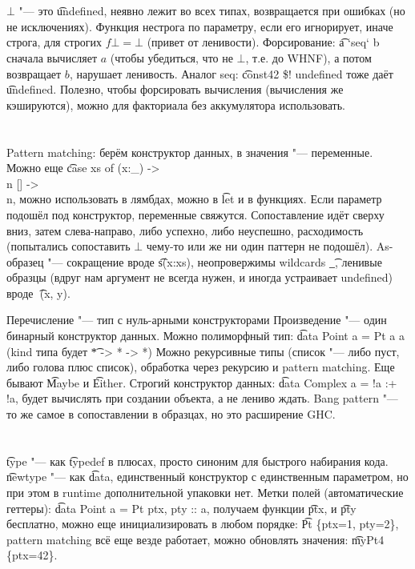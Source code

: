 \section{} %
$\bot$ "--- это \t{undefined}, неявно лежит во всех типах,
возвращается при ошибках (но не исключениях).
Функция нестрога по параметру, если его игнорирует, иначе строга,
для строгих $f \bot = \bot$ (привет от ленивости).
Форсирование: \t{a `seq` b} сначала вычисляет $a$ (чтобы убедиться, что не $\bot$,
т.е. до WHNF), а потом возвращает $b$, нарушает ленивость.
Аналог seq: \t{const42 \$! undefined} тоже даёт \t{undefined}.
Полезно, чтобы форсировать вычисления (вычисления же кэшируются),
можно для факториала без аккумулятора использовать.

\section{} %
Pattern matching: берём конструктор данных, в значения "--- переменные.
Можно еще \t{case xs of (x:\_) -> \\n [] -> \\n}, можно использовать в лямбдах,
можно в \t{let} и в функциях.
Если параметр подошёл под конструктор, переменные свяжутся.
Сопоставление идёт сверху вниз, затем слева-направо, либо успехно, либо неуспешно,
расходимость (попытались сопоставить $\bot$ чему-то или же ни один паттерн не подошёл).
As-образец "--- сокращение вроде \t{s\@(x:xs)}, неопровержимы wildcards \t{\_},
ленивые образцы (вдруг нам аргумент не всегда нужен, и иногда устраивает undefined) вроде \t{~(x, y)}.

Перечисление "--- тип с нуль-арными конструкторами
Произведение "--- один бинарный конструктор данных.
Можно полиморфный тип: \t{data Point a = Pt a a} (kind типа будет \t{* -> * -> *})
Можно рекурсивные типы (список "--- либо пуст, либо голова плюс список), обработка
через рекурсию и pattern matching.
Еще бывают \t{Maybe} и \t{Either}.
Строгий конструктор данных: \t{data Complex a = !a :+ !a}, будет вычислять при создании объекта,
а не лениво ждать.
Bang pattern "--- то же самое в сопоставлении в образцах, но это расширение GHC.

\section{} %
\t{type} "--- как \t{typedef} в плюсах, просто синоним для быстрого набирания кода.
\t{newtype} "--- как \t{data}, единственный конструктор с единственным параметром,
но при этом в runtime дополнительной упаковки нет.
Метки полей (автоматические геттеры): \t{data Point a = Pt {ptx, pty :: a}},
получаем функции \t{ptx}, и \t{pty} бесплатно,
можно еще инициализировать в любом порядке: \t{Pt \{ptx=1, pty=2\}},
pattern matching всё еще везде работает,
можно обновлять значения: \t{myPt4 \{ptx=42\}}.

